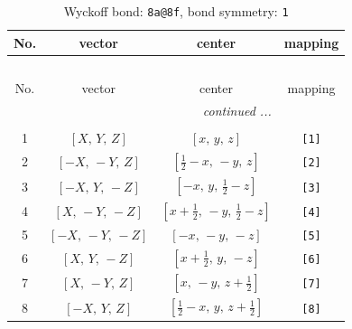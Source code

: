\documentclass[fleqn,8pt]{jsarticle}
\begin{document}
\begin{longtable}{cccc}
\caption{Wyckoff bond: {\tt 8a@8f}, bond symmetry: {\tt 1}}
 \\
 \hline \hline
No. & vector & center & mapping \\ \hline \endfirsthead

\multicolumn{3}{l}{\tablename\ \thetable{}} \\
 \hline \hline
No. & vector & center & mapping \\ \hline \endhead

 \hline \hline
\multicolumn{3}{r}{\footnotesize\it continued ...} \\ \endfoot

 \hline \hline
\multicolumn{3}{r}{} \\ \endlastfoot

1 & $\left[ X,\, Y,\, Z \right]$ & $\left[ x,\, y,\, z \right]$ & {\tt [1]} \\ \hline
2 & $\left[ - X,\, - Y,\, Z \right]$ & $\left[ \frac{1}{2} - x,\, - y,\, z \right]$ & {\tt [2]} \\ \hline
3 & $\left[ - X,\, Y,\, - Z \right]$ & $\left[ - x,\, y,\, \frac{1}{2} - z \right]$ & {\tt [3]} \\ \hline
4 & $\left[ X,\, - Y,\, - Z \right]$ & $\left[ x + \frac{1}{2},\, - y,\, \frac{1}{2} - z \right]$ & {\tt [4]} \\ \hline
5 & $\left[ - X,\, - Y,\, - Z \right]$ & $\left[ - x,\, - y,\, - z \right]$ & {\tt [5]} \\ \hline
6 & $\left[ X,\, Y,\, - Z \right]$ & $\left[ x + \frac{1}{2},\, y,\, - z \right]$ & {\tt [6]} \\ \hline
7 & $\left[ X,\, - Y,\, Z \right]$ & $\left[ x,\, - y,\, z + \frac{1}{2} \right]$ & {\tt [7]} \\ \hline
8 & $\left[ - X,\, Y,\, Z \right]$ & $\left[ \frac{1}{2} - x,\, y,\, z + \frac{1}{2} \right]$ & {\tt [8]} \\
\end{longtable}
\end{document}
